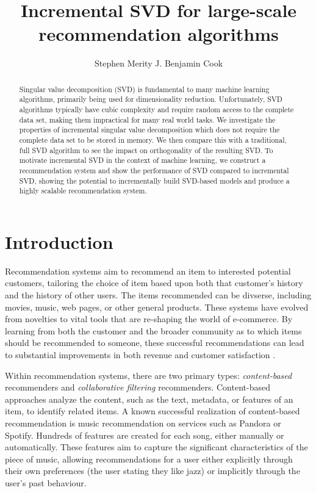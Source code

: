 \documentclass{article} %
\title{Incremental SVD for large-scale recommendation algorithms}
\author{
Stephen Merity
\And
J. Benjamin Cook
}
\begin{document}
\maketitle

\begin{abstract}
Singular value decomposition (SVD) is fundamental to many machine learning algorithms, primarily being used for dimensionality reduction.
Unfortunately, SVD algorithms typically have cubic complexity and require random access to the complete data set, making them impractical for many real world tasks.
We investigate the properties of incremental singular value decomposition which does not require the complete data set to be stored in memory.
We then compare this with a traditional, full SVD algorithm to see the impact on orthogonality of the resulting SVD.
To motivate incremental SVD in the context of machine learning, we construct a recommendation system and show the performance of SVD compared to incremental SVD, showing the potential to incrementally build SVD-based models and produce a highly scalable recommendation system.
\end{abstract}

\section{Introduction}

Recommendation systems aim to recommend an item to interested potential customers, tailoring the choice of item based upon both that customer's history and the history of other users.
The items recommended can be divserse, including movies, music, web pages, or other general products.
These systems have evolved from novelties to vital tools that are re-shaping the world of e-commerce.
By learning from both the customer and the broader community as to which items should be recommended to someone, these successful recommendations can lead to substantial improvements in both revenue and customer satisfaction \citep{schafer1999recommender}.

Within recommendation systems, there are two primary types: \textit{content-based} recommenders and \textit{collaborative filtering} recommenders.
Content-based approaches analyze the content, such as the text, metadata, or features of an item, to identify related items.
A known successful realization of content-based recommendation is music recommendation on services such as Pandora or Spotify.
Hundreds of features are created for each song, either manually or automatically.
These features aim to capture the significant characteristics of the piece of music, allowing recommendations for a user either explicitly through their own preferences (the user stating they like jazz) or implicitly through the user's past behaviour.
\end{document}
